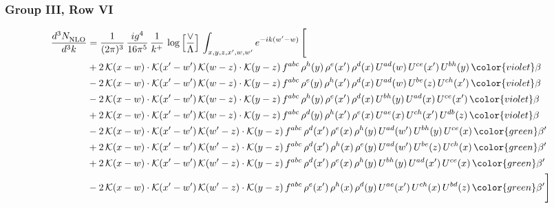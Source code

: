 \subsubsection{Group III, Row VI}
\begin{align}
     \frac{d^{3}N_{\rm NLO}^{\rm}}{d^{3}k}  & = \frac{1}{(2\pi)^{3}}\, \frac{ig^{4}}{16\pi^{5}}\, \frac{1}{k^{+}}\, \log{\left[\frac{\vee}{\Lambda}\right]}\, \int_{x,y,z,x^{\prime},w,w^{\prime}}e^{-ik(w^{\prime}-w)}\, \Bigg[\notag \\ & +2\,\mathcal{K}(x-w)\cdot\mathcal{K}(x'-w')\,\mathcal{K}(w-z)\cdot\mathcal{K}(y-z)\, f^{abc}\,\rho^{h}(y)\,\rho^{e}(x')\,\rho^{d}(x)\,U^{ad}(w)\,U^{ce}(x')\,U^{bh}(y)\,{\color{violet} \beta}\notag\\ &-2\,\mathcal{K}(x-w)\cdot\mathcal{K}(x'-w')\,\mathcal{K}(w-z)\cdot\mathcal{K}(y-z)\, f^{abc}\,\rho^{e}(y)\,\rho^{h}(x')\,\rho^{d}(x)\,U^{ad}(w)\,U^{be}(z)\,U^{ch}(x')\,{\color{violet} \beta}\notag \\ &-2\,\mathcal{K}(x-w)\cdot\mathcal{K}(x'-w')\,\mathcal{K}(w-z)\cdot\mathcal{K}(y-z)\, f^{abc}\,\rho^{h}(y)\,\rho^{e}(x')\,\rho^{d}(x)\,U^{bh}(y)\,U^{ad}(x)\,U^{ce}(x')\,{\color{violet} \beta}\notag\\ & +2\,\mathcal{K}(x-w)\cdot\mathcal{K}(x'-w')\,\mathcal{K}(w-z)\cdot\mathcal{K}(y-z)\, f^{abc}\,\rho^{d}(y)\,\rho^{h}(x')\,\rho^{e}(x)\,U^{ae}(x)\,U^{ch}(x')\,U^{db}(z)\,{\color{violet} \beta}\notag\\ & -2\, \mathcal{K}(x-w) \cdot \mathcal{K}(x'-w')\, \mathcal{K}(w'-z) \cdot \mathcal{K}(y-z)\, f^{abc}\, \rho^{d}(x')\,\rho^{e}(x)\, \rho^{h}(y)\,U^{ad}(w')\,U^{bh}(y)\,U^{ce}(x)\, {\color{green} \beta'}\notag \\ & + 2\, \mathcal{K}(x-w) \cdot \mathcal{K}(x'-w')\, \mathcal{K}(w'-z) \cdot \mathcal{K}(y-z)\, f^{abc}\, \rho^{d}(x')\,\rho^{h}(x)\, \rho^{e}(y)\,U^{ad}(w')\,U^{be}(z)\,U^{ch}(x)\, {\color{green} \beta'}\notag \\ & +2\, \mathcal{K}(x-w) \cdot \mathcal{K}(x'-w')\, \mathcal{K}(w'-z) \cdot \mathcal{K}(y-z)\, f^{abc}\, \rho^{d}(x')\,\rho^{e}(x)\, \rho^{h}(y)\,U^{bh}(y)\,U^{ad}(x')\,U^{ce}(x)\, {\color{green} \beta'}\notag \\ & -2\, \mathcal{K}(x-w) \cdot \mathcal{K}(x'-w')\, \mathcal{K}(w'-z) \cdot \mathcal{K}(y-z)\, f^{abc}\, \rho^{e}(x')\,\rho^{h}(x)\, \rho^{d}(y)\,U^{ae}(x')\,U^{ch}(x)\,U^{bd}(z)\, {\color{green} \beta'}\Bigg]
\end{align}
